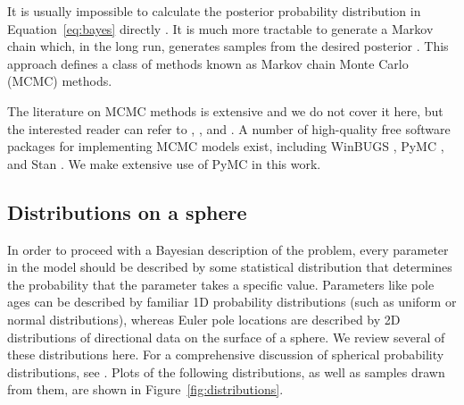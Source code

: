 \documentclass[preprint,12pt,authoryear]{elsarticle}
\begin{document}
It is usually impossible to calculate the posterior
probability distribution in Equation~\eqref{eq:bayes} directly \citep{davidson2015bayesian}. 
It is much more tractable to generate a Markov chain which, in the long run,
generates samples from the desired posterior \citep{gelman2014bayesian}.
This approach defines a class of methods known as Markov chain Monte Carlo (MCMC) methods.

The literature on MCMC methods is extensive and we do not cover it here, but
the interested reader can refer to \citet{gelman1996markov}, \citet{sambridge2013transdimensional},
and \citet{davidson2015bayesian}. A number of high-quality free software packages
for implementing MCMC models exist, including WinBUGS \citep{lunn2000winbugs}, 
PyMC \citep{patil2010pymc}, and Stan \citep{carpenter2016stan}.
We make extensive use of PyMC in this work.

\subsection{Distributions on a sphere}

In order to proceed with a Bayesian description of the problem, every parameter
in the model should be described by some statistical distribution that determines
the probability that the parameter takes a specific value.
Parameters like pole ages can be described by familiar 1D probability distributions
(such as uniform or normal distributions), whereas Euler pole locations are
described by 2D distributions of directional data on the surface of a sphere.
We review several of these distributions here.
For a comprehensive discussion of spherical probability distributions,
see \citet{fisher1987statistical}. Plots of the following distributions, as well as
samples drawn from them, are shown in Figure~\ref{fig:distributions}. 
\end{document}
